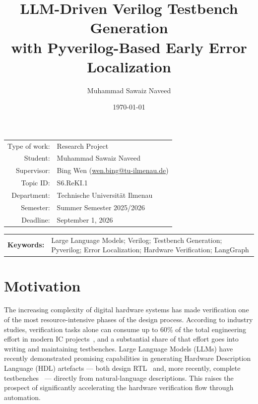 \documentclass[11pt,a4paper, titlepage=false]{scrreprt}
\begin{document}
\title{LLM-Driven Verilog Testbench Generation\\with Pyverilog-Based Early Error Localization}
\author{Muhammad Sawaiz Naveed}
\date{\today}
\maketitle
\vspace{1cm}

\begin{tabular}{r l}
Type of work: & Research Project \\
Student:      & Muhammad Sawaiz Naveed \\
Supervisor:   & Bing Wen (\href{mailto:wen.bing@tu-ilmenau.de}{wen.bing@tu-ilmenau.de}) \\
Topic ID:     & S6.ReKI.1 \\
Department:   & Technische Universität Ilmenau \\
Semester:     & Summer Semester 2025/2026 \\
Deadline:     & September 1, 2026 \\
\end{tabular}

\vspace{3mm}

\begin{tabular}{l p{}}
\\
\textbf{Keywords:} & Large Language Models; Verilog; Testbench Generation; Pyverilog; Error Localization; Hardware Verification; LangGraph \\
\end{tabular}

\vspace{8mm}


\section*{Motivation}

The increasing complexity of digital hardware systems has made verification one of the most
resource-intensive phases of the design process. According to industry studies, verification
tasks alone can consume up to 60\% of the total engineering effort in modern IC
projects~\cite{wilson2022}, and a substantial share of that effort goes into writing and
maintaining testbenches. Large Language Models (LLMs) have recently demonstrated promising
capabilities in generating Hardware Description Language (HDL) artefacts --- both design
RTL~\cite{liu2023verilogeval,thakur2023autochip} and, more recently, complete
testbenches~\cite{qiu2024autobench} --- directly from natural-language descriptions. This
raises the prospect of significantly accelerating the hardware verification flow through
automation.
\end{document}

